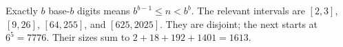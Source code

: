Exactly $b$ base-$b$ digits means $b^{b-1}\le n<b^b$. The relevant intervals are $[2,3]$, $[9,26]$, $[64,255]$, and $[625,2025]$. They are disjoint; the next starts at $6^5=7776$. Their sizes sum to $2+18+192+1401=\boxed{1613}$.
